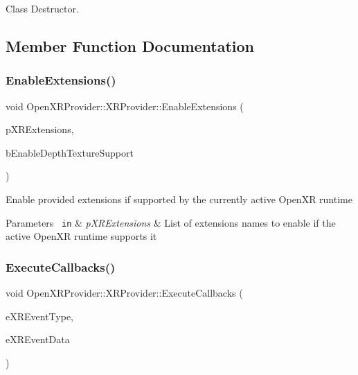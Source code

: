 Class Destructor. 



\subsection{Member Function Documentation}
\mbox{\label{class_open_x_r_provider_1_1_x_r_provider_a58c1f88d3c9f28e99ac784767089357c}} 
\subsubsection{\texorpdfstring{EnableExtensions()}{EnableExtensions()}}
{\footnotesize\ttfamily void Open\+X\+R\+Provider\+::\+X\+R\+Provider\+::\+Enable\+Extensions (\begin{DoxyParamCaption}\item[{std\+::vector$<$ const char $\ast$ $>$ \&}]{p\+X\+R\+Extensions,  }\item[{bool}]{b\+Enable\+Depth\+Texture\+Support }\end{DoxyParamCaption})\hspace{0.3cm}{\ttfamily [private]}}

Enable provided extensions if supported by the currently active Open\+XR runtime 
\begin{DoxyParams}[1]{Parameters}
\mbox{\texttt{ in}}  & {\em p\+X\+R\+Extensions} & List of extensions names to enable if the active Open\+XR runtime supports it \\
\hline
\end{DoxyParams}
\mbox{\label{class_open_x_r_provider_1_1_x_r_provider_a12702a0d244674e54443ccf5053a3efb}} 
\subsubsection{\texorpdfstring{ExecuteCallbacks()}{ExecuteCallbacks()}}
{\footnotesize\ttfamily void Open\+X\+R\+Provider\+::\+X\+R\+Provider\+::\+Execute\+Callbacks (\begin{DoxyParamCaption}\item[{const \mbox{\hyperlink{namespace_open_x_r_provider_aa80d286c249d35071f2ff4d19d9dc4c3}{E\+X\+R\+Event\+Type}}}]{e\+X\+R\+Event\+Type,  }\item[{const \mbox{\hyperlink{namespace_open_x_r_provider_a45de367abcea927b192e21d1c8b9853d}{E\+X\+R\+Event\+Data}}}]{e\+X\+R\+Event\+Data }\end{DoxyParamCaption})\hspace{0.3cm}{\ttfamily [private]}}

